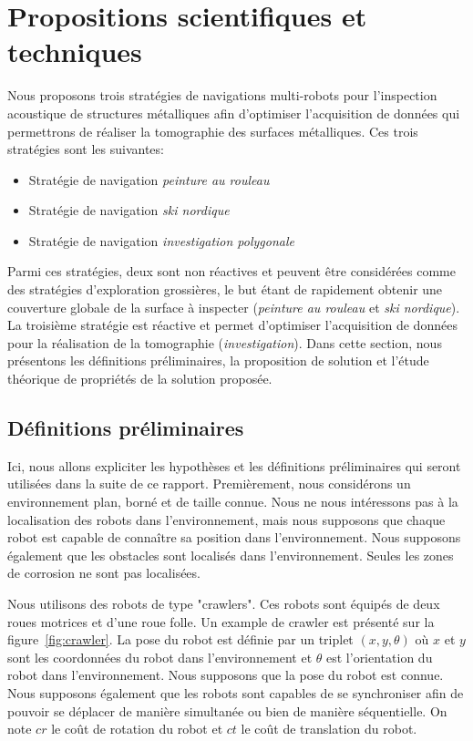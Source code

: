 \documentclass[francais,RandD]{rapportPFE}
\begin{document}
	\section{Propositions scientifiques et techniques}
		Nous proposons trois stratégies de navigations multi-robots pour l'inspection acoustique de structures métalliques afin d'optimiser l'acquisition de données qui permettrons de réaliser la tomographie des surfaces métalliques. Ces trois stratégies sont les suivantes:
		\begin{itemize}
			\item Stratégie de navigation \textit{peinture au rouleau}
			\item Stratégie de navigation \textit{ski nordique}
			\item Stratégie de navigation \textit{investigation polygonale}
		\end{itemize}
		Parmi ces stratégies, deux sont non réactives et peuvent être considérées comme des stratégies d'exploration grossières, le but étant de rapidement obtenir une couverture globale de la surface à inspecter (\textit{peinture au rouleau} et \textit{ski nordique}).
		La troisième stratégie est réactive et permet d'optimiser l'acquisition de données pour la réalisation de la tomographie (\textit{investigation}).
		Dans cette section, nous présentons les définitions préliminaires, la proposition de solution et l'étude théorique de propriétés de la solution proposée.
		\subsection{Définitions préliminaires}
			Ici, nous allons expliciter les hypothèses et les définitions préliminaires qui seront utilisées dans la suite de ce rapport.
			Premièrement, nous considérons un environnement plan, borné et de taille connue.
			Nous ne nous intéressons pas à la localisation des robots dans l'environnement, mais nous supposons que chaque robot est capable de connaître sa position dans l'environnement.
			Nous supposons également que les obstacles sont localisés dans l'environnement.
			Seules les zones de corrosion ne sont pas localisées.

			Nous utilisons des robots de type "crawlers". Ces robots sont équipés de deux roues motrices et d'une roue folle.
			Un example de crawler est présenté sur la figure~\ref{fig:crawler}.
			La pose du robot est définie par un triplet $(x, y, \theta)$ où $x$ et $y$ sont les coordonnées du robot dans l'environnement et $\theta$ est l'orientation du robot dans l'environnement.
			Nous supposons que la pose du robot est connue.
			Nous supposons également que les robots sont capables de se synchroniser afin de pouvoir se déplacer de manière simultanée ou bien de manière séquentielle.
			On note $cr$ le coût de rotation du robot et $ct$ le coût de translation du robot.
\end{document}
